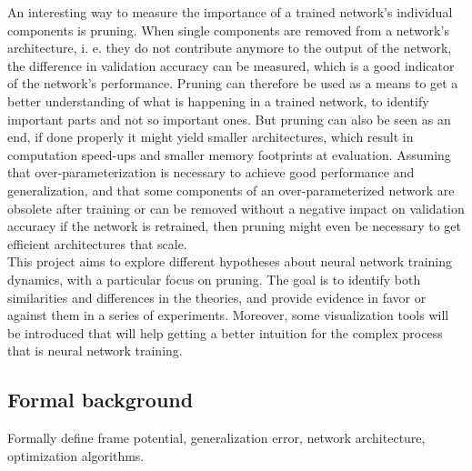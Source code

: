 An interesting way to measure the importance of a trained network's individual components is pruning. When single components are removed from a network's architecture, i. e. they do not contribute anymore to the output of the network, the difference in validation accuracy can be measured, which is a good indicator of the network's performance. Pruning can therefore be used as a means to get a better understanding of what is happening in a trained network, to identify important parts and not so important ones. But pruning can also be seen as an end, if done properly it might yield smaller architectures, which result in computation speed-ups and smaller memory footprints at evaluation. Assuming that over-parameterization is necessary to achieve good performance and generalization, and that some components of an over-parameterized network are obsolete after training or can be removed without a negative impact on validation accuracy if the network is retrained, then pruning might even be necessary to get efficient architectures that scale. \\

This project aims to explore different hypotheses about neural network training dynamics, with a particular focus on pruning. The goal is to identify both similarities and differences in the theories, and provide evidence in favor or against them in a series of experiments. Moreover, some visualization tools will be introduced that will help getting a better intuition for the complex process that is neural network training.

\subsection{Formal background}

Formally define frame potential, generalization error, network architecture, optimization algorithms. 

